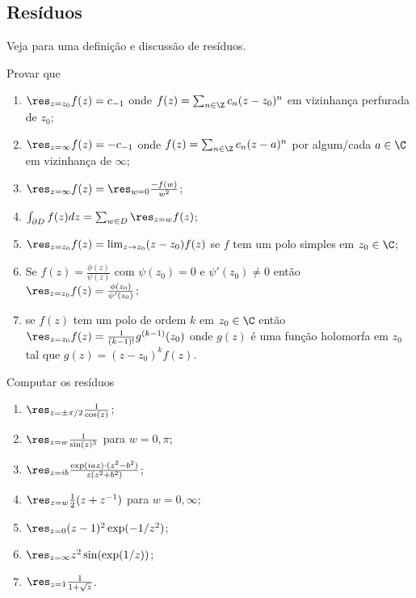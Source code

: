 \subsection{Resíduos}

Veja  para uma definição e discussão de resíduos.

\begin{problema}
Provar que
\begin{enumerate}
\item $\res_{z=z_0} f(z) = c_{-1}$ onde $f(z) = \sum_{n\in\Z} c_n (z-z_0)^n$
em vizinhança perfurada de $z_0$;
\item $\res_{z=\infty} f(z) = - c_{-1}$ onde $f(z) = \sum_{n\in\Z} c_n (z-a)^n$
por algum/cada $a\in\C$ em vizinhança de $\infty$;
\item $\res_{z=\infty} f(z) = \res_{w=0} \frac{-f(w)}{w^2}$;
\item $\int_{\partial D} f(z) dz = \sum_{w\in D} \res_{z=w} f(z)$;
\item $\res_{z=z_0} f(z) = \lim_{z\to z_0} (z-z_0) f(z)$ se $f$ tem um polo simples em $z_0\in\C$;
\item Se $f(z) = \frac{\phi(z)}{\psi(z)}$ com $\psi(z_0)=0$ e $\psi'(z_0)\neq 0$
então $\res_{z=z_0} f(z) = \frac{\phi(z_0)}{\psi'(z_0)}$;
\item se $f(z)$ tem um polo de ordem $k$ em $z_0\in\C$ então
$\res_{z=z_0} f(z) = \frac{1}{(k-1)!} g^{(k-1)}(z_0)$ onde $g(z)$ é uma função holomorfa em $z_0$
tal que $g(z) = (z-z_0)^k f(z)$.
\end{enumerate}
\end{problema}

\begin{problema}
Computar os resíduos
\begin{enumerate}
\item $\res_{z=\pm \pi/2} \frac{1}{\cos(z)}$;
\item $\res_{z=w} \frac{1}{\sin(z)^3}$ para $w=0,\pi$;
\item $\res_{z=ib} \frac{\exp(iaz) \cdot (z^2-b^2)}{z(z^2+b^2)}$;
\item $\res_{z=w} \frac12 (z+z^{-1})$ para $w=0,\infty$;
\item $\res_{z=0} (z-1)^2 \exp(-1/z^2)$;
\item $\res_{z=\infty} z^2 \sin(\exp(1/z))$;
\item $\res_{z=1} \frac{1}{1+\sqrt{z}}$.
\end{enumerate}
\end{problema}

